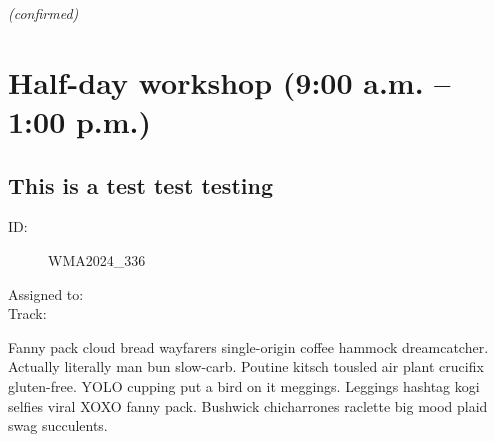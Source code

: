 \documentclass{report}
\begin{document}
                
                

                
                \emph{ (confirmed) }
              

              

              

              
    \newpage
    \chapter*{ Half-day workshop (9:00 a.m. – 1:00 p.m.) }

      
        
          \newpage
          \section{ This is a test test testing }
            \begin{description}
              \item [ID:]
              WMA2024\_336

              \item [Assigned to:]
                \item [Track:]
              \end{description}

              Fanny pack cloud bread wayfarers single-origin coffee hammock dreamcatcher. Actually literally man bun slow-carb. Poutine kitsch tousled air plant crucifix gluten-free. YOLO cupping put a bird on it meggings. Leggings hashtag kogi selfies viral XOXO fanny pack. Bushwick chicharrones raclette big mood plaid swag succulents.
\end{document}
